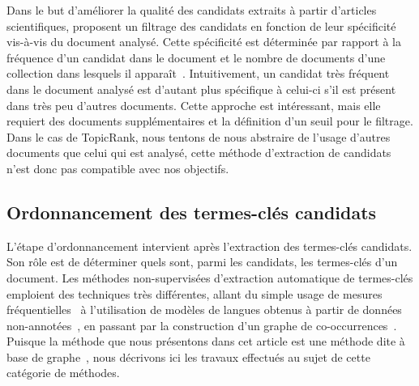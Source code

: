     Dans le but d'améliorer la qualité des candidats extraits à partir
    d'articles scientifiques,  proposent un
    filtrage des candidats en fonction de leur spécificité vis-à-vis du document
    analysé. Cette spécificité est déterminée par rapport à la fréquence d'un
    candidat dans le document et le nombre de documents d'une collection dans
    lesquels il apparaît~\cite[TF-IDF]{jones1972tfidf}. Intuitivement, un
    candidat très fréquent dans le document analysé est d'autant plus spécifique
    à celui-ci s'il est présent dans très peu d'autres documents. Cette approche
    est intéressant, mais elle requiert des documents  supplémentaires et la
    définition d'un seuil pour le filtrage. Dans le cas de TopicRank, nous
    tentons de nous abstraire de l'usage d'autres documents que celui qui est
    analysé, cette méthode d'extraction de candidats n'est donc pas compatible
    avec nos objectifs.

  \subsection{Ordonnancement des termes-clés candidats}
  \label{subsec:ordonnancement_des_termes_cles_candidats}
    L'étape d'ordonnancement intervient après l'extraction des termes-clés
    candidats. Son rôle est de déterminer quels sont, parmi les candidats, les
    termes-clés d'un document.
    Les méthodes non-supervisées d'extraction automatique de termes-clés
    emploient des techniques très différentes, allant du simple usage de mesures
    fréquentielles~\cite{jones1972tfidf,paukkeri2010likey} à l'utilisation de
    modèles de langues obtenus à partir de données
    non-annotées~\cite{tomokiyo2003languagemodel}, en passant par la
    construction d'un graphe de co-occurrences~\cite{mihalcea2004textrank}.
    Puisque la méthode que nous présentons dans cet article est une méthode dite
    \og à base de graphe~\fg, nous décrivons ici les travaux effectués au sujet
    de cette catégorie de méthodes.

